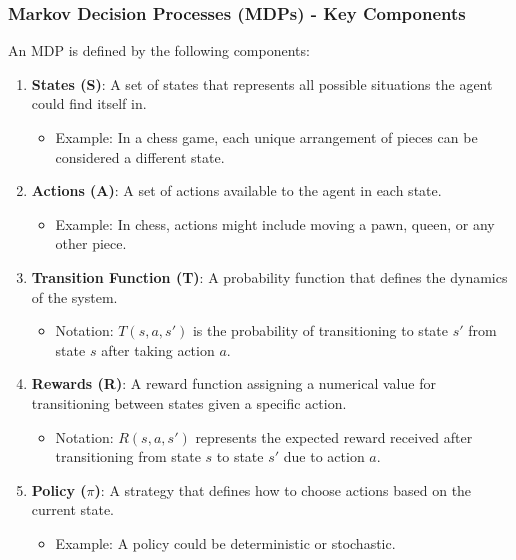 \documentclass[aspectratio=169]{beamer}
\begin{document}
\begin{frame}[fragile]
    \frametitle{Markov Decision Processes (MDPs) - Key Components}
    An MDP is defined by the following components:
    \begin{enumerate}
        \item \textbf{States (S)}: A set of states that represents all possible situations the agent could find itself in.
        \begin{itemize}
            \item Example: In a chess game, each unique arrangement of pieces can be considered a different state.
        \end{itemize}
        
        \item \textbf{Actions (A)}: A set of actions available to the agent in each state.
        \begin{itemize}
            \item Example: In chess, actions might include moving a pawn, queen, or any other piece.
        \end{itemize}
        
        \item \textbf{Transition Function (T)}: A probability function that defines the dynamics of the system.
        \begin{itemize}
            \item Notation: $T(s, a, s')$ is the probability of transitioning to state $s'$ from state $s$ after taking action $a$.
        \end{itemize}
        
        \item \textbf{Rewards (R)}: A reward function assigning a numerical value for transitioning between states given a specific action.
        \begin{itemize}
            \item Notation: $R(s, a, s')$ represents the expected reward received after transitioning from state $s$ to state $s'$ due to action $a$.
        \end{itemize}
        
        \item \textbf{Policy ($\pi$)}: A strategy that defines how to choose actions based on the current state.
        \begin{itemize}
            \item Example: A policy could be deterministic or stochastic.
        \end{itemize}
    \end{enumerate}
\end{frame}
\end{document}
